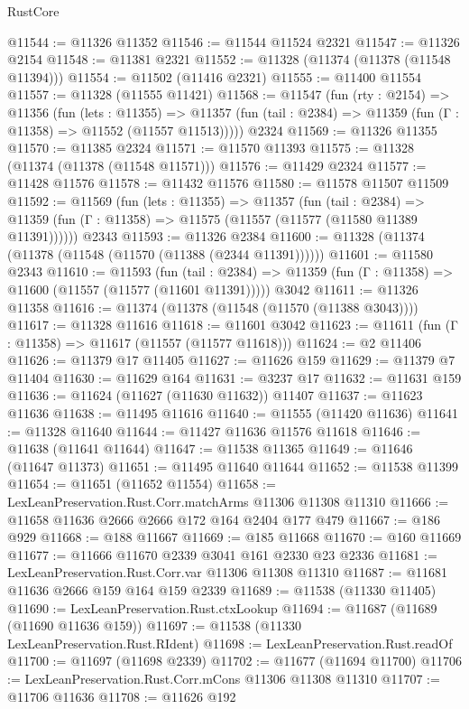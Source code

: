 \begin{lexlean}{RustCore}
\begin{coremodule}
@11544 := @11326 @11352
@11546 := @11544 @11524 @2321
@11547 := @11326 @2154
@11548 := @11381 @2321
@11552 := @11328 (@11374 (@11378 (@11548 @11394)))
@11554 := @11502 (@11416 @2321)
@11555 := @11400 @11554
@11557 := @11328 (@11555 @11421)
@11568 := @11547
    (fun (rty : @2154) =>
    @11356
      (fun (lets : @11355) =>
      @11357 (fun (tail : @2384) => @11359 (fun (Γ : @11358) => @11552 (@11557 @11513)))))
    @2324
@11569 := @11326 @11355
@11570 := @11385 @2324
@11571 := @11570 @11393
@11575 := @11328 (@11374 (@11378 (@11548 @11571)))
@11576 := @11429 @2324
@11577 := @11428 @11576
@11578 := @11432 @11576
@11580 := @11578 @11507 @11509
@11592 := @11569
    (fun (lets : @11355) =>
    @11357
      (fun (tail : @2384) =>
      @11359 (fun (Γ : @11358) => @11575 (@11557 (@11577 (@11580 @11389 @11391))))))
    @2343
@11593 := @11326 @2384
@11600 := @11328 (@11374 (@11378 (@11548 (@11570 (@11388 (@2344 @11391))))))
@11601 := @11580 @2343
@11610 := @11593
    (fun (tail : @2384) => @11359 (fun (Γ : @11358) => @11600 (@11557 (@11577 (@11601 @11391)))))
    @3042
@11611 := @11326 @11358
@11616 := @11374 (@11378 (@11548 (@11570 (@11388 @3043))))
@11617 := @11328 @11616
@11618 := @11601 @3042
@11623 := @11611 (fun (Γ : @11358) => @11617 (@11557 (@11577 @11618)))
@11624 := @2 @11406
@11626 := @11379 @17 @11405
@11627 := @11626 @159
@11629 := @11379 @7 @11404
@11630 := @11629 @164
@11631 := @3237 @17
@11632 := @11631 @159
@11636 := @11624 (@11627 (@11630 @11632)) @11407
@11637 := @11623 @11636
@11638 := @11495 @11616
@11640 := @11555 (@11420 @11636)
@11641 := @11328 @11640
@11644 := @11427 @11636 @11576 @11618
@11646 := @11638 (@11641 @11644)
@11647 := @11538 @11365
@11649 := @11646 (@11647 @11373)
@11651 := @11495 @11640 @11644
@11652 := @11538 @11399
@11654 := @11651 (@11652 @11554)
@11658 := LexLeanPreservation.Rust.Corr.matchArms @11306 @11308 @11310
@11666 := @11658 @11636 @2666 @2666 @172 @164 @2404 @177 @479
@11667 := @186 @929
@11668 := @188 @11667
@11669 := @185 @11668
@11670 := @160 @11669
@11677 := @11666 @11670 @2339 @3041 @161 @2330 @23 @2336
@11681 := LexLeanPreservation.Rust.Corr.var @11306 @11308 @11310
@11687 := @11681 @11636 @2666 @159 @164 @159 @2339
@11689 := @11538 (@11330 @11405)
@11690 := LexLeanPreservation.Rust.ctxLookup
@11694 := @11687 (@11689 (@11690 @11636 @159))
@11697 := @11538 (@11330 LexLeanPreservation.Rust.RIdent)
@11698 := LexLeanPreservation.Rust.readOf
@11700 := @11697 (@11698 @2339)
@11702 := @11677 (@11694 @11700)
@11706 := LexLeanPreservation.Rust.Corr.mCons @11306 @11308 @11310
@11707 := @11706 @11636
@11708 := @11626 @192

\end{coremodule}
\end{lexlean}
